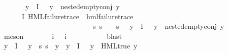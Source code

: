 \begin{isabellebody}
\ \ \ \ \ \ \ {\isacharparenleft}{\kern0pt}{\isasymforall}y{\isasymin}{\isasymPhi}\ {\isacharbackquote}{\kern0pt}\ I{\isachardot}{\kern0pt}\ {\isasympsi}\ {\isasymnoteq}\ y\ {\isasymlongrightarrow}\ nested{\isacharunderscore}{\kern0pt}empty{\isacharunderscore}{\kern0pt}conj\ y{\isacharparenright}{\kern0pt}{\isachardoublequoteclose}\isanewline
\ \ \ \ \isamarkupfalse%
\ \isamarkupfalse%
\ {\isasymphi}\ {\isasympsi}\ \ {\isachardoublequoteopen}{\isasymphi}{\isasymin}{\isasymPhi}\ {\isacharbackquote}{\kern0pt}\ I{\isachardoublequoteclose}\ {\isachardoublequoteopen}HML{\isacharunderscore}{\kern0pt}failure{\isacharunderscore}{\kern0pt}trace\ {\isasymphi}{\isachardoublequoteclose}\ {\isachardoublequoteopen}hml{\isacharunderscore}{\kern0pt}failure{\isacharunderscore}{\kern0pt}trace\ {\isasympsi}{\isachardoublequoteclose}\ \isanewline
\ \ \ \ \ \ \ \ \ \ \ \ \ \ \ \ \ \ \ \ \ \ \ \ \ \ {\isachardoublequoteopen}{\isacharparenleft}{\kern0pt}{\isasymforall}s{\isachardot}{\kern0pt}\ {\isacharparenleft}{\kern0pt}s\ {\isasymTurnstile}\ {\isasymphi}{\isacharparenright}{\kern0pt}\ {\isacharequal}{\kern0pt}\ {\isacharparenleft}{\kern0pt}s\ {\isasymTurnstile}\ {\isasympsi}{\isacharparenright}{\kern0pt}{\isacharparenright}{\kern0pt}{\isachardoublequoteclose}\ {\isachardoublequoteopen}{\isacharparenleft}{\kern0pt}{\isasymforall}y{\isasymin}{\isasymPhi}\ {\isacharbackquote}{\kern0pt}\ I{\isachardot}{\kern0pt}\ {\isasymphi}\ {\isasymnoteq}\ y\ {\isasymlongrightarrow}\ nested{\isacharunderscore}{\kern0pt}empty{\isacharunderscore}{\kern0pt}conj\ y{\isacharparenright}{\kern0pt}{\isachardoublequoteclose}\isanewline
\ \ \ \ \ \ \isamarkupfalse%
\ meson\isanewline
\ \ \ \ \isamarkupfalse%
\ \isamarkupfalse%
\ i{\isacharunderscore}{\kern0pt}{\isasymphi}\ \ {\isachardoublequoteopen}{\isasymPhi}\ i{\isacharunderscore}{\kern0pt}{\isasymphi}\ {\isacharequal}{\kern0pt}\ {\isasymphi}{\isachardoublequoteclose}\ \isanewline
\ \ \ \ \ \ \isamarkupfalse%
\ blast\isanewline
\ \ \ \ \isamarkupfalse%
\ {\isachardoublequoteopen}{\isasymexists}y\ {\isasymin}\ {\isasymPhi}{\isacharbackquote}{\kern0pt}I{\isachardot}{\kern0pt}\ {\isasymphi}\ {\isasymnoteq}\ y\ {\isasymand}\ {\isacharparenleft}{\kern0pt}{\isasymforall}s{\isachardot}{\kern0pt}\ {\isasymnot}{\isacharparenleft}{\kern0pt}s\ {\isasymTurnstile}\ y{\isacharparenright}{\kern0pt}{\isacharparenright}{\kern0pt}{\isachardoublequoteclose}\ {\isacharbar}{\kern0pt}\ {\isachardoublequoteopen}{\isacharparenleft}{\kern0pt}{\isasymforall}y{\isasymin}{\isasymPhi}\ {\isacharbackquote}{\kern0pt}\ I{\isachardot}{\kern0pt}\ {\isasymphi}\ {\isasymnoteq}\ y\ {\isasymlongrightarrow}\ HML{\isacharunderscore}{\kern0pt}true\ y{\isacharparenright}{\kern0pt}{\isachardoublequoteclose}\isanewline

\end{isabellebody}

